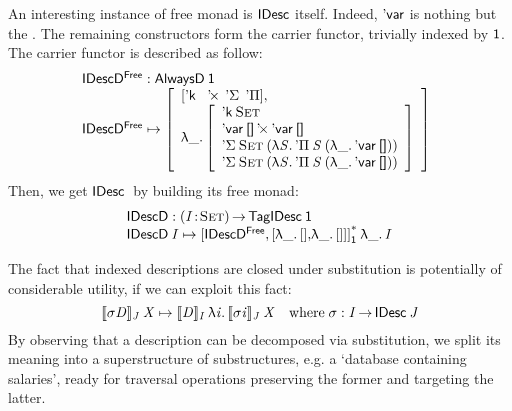 An interesting instance of free monad is $\SYMBIDesc$ itself. Indeed,
$\SYMBDVar$ is nothing but the \return. The remaining constructors form
the carrier functor, trivially indexed by $\Unit$. The carrier functor
is described as follow:
%
\[\stk{
\IDescFreeD : \ATagIDesc{\Unit} \\
\begin{array}{@{}ll}
\IDescFreeD \mapsto \bigRedBracket{\begin{array}{l}
                                \sqr{\SYMBDConst\:\:
                                     \DProd\:\:
                                     \SYMBDSigma\:\:
                                     \SYMBDPi} \red{,}\\
                                  \LAM{\_}\bigRedBracket{\begin{array}{l}
                                        \DConst{\Set}               \\
                                        \DProd{\DVar{\Void}}{\DVar{\Void}}  \\
                                        \DSigma{\Set}{(\LAM{\V{S}} \DPi{\V{S}}{(\LAM{\_} \DVar{\Void})})} \\
                                        \DSigma{\Set}{(\LAM{\V{S}} \DPi{\V{S}}{(\LAM{\_} \DVar{\Void})})}
                                    \end{array}}\end{array}}
\end{array}
}\]
%
Then, we get $\IDesc$ by building its free monad:
%
\[\stk{
\IDescD : \PI{\V{I}}{\Set} \TagIDesc{\Unit} \\
\IDescD\: \V{I} \mapsto \FreeIMonad{\red{[}\IDescFreeD\red{,[}\LAM{\_}\sqr{}\red{,}\LAM{\_}\red{[]]]}}{\Unit}\LAM{\_}\V{I}
}\]

The fact that indexed descriptions are closed under substitution
is potentially of considerable utility, if we can exploit this fact:
\[
\idescop{\V{\sigma} \V{D}}{\V{J}}{\V{X}} 
    \mapsto 
        \idescop{\V{D}}
                {\V{I}}
                {\LAM{\V{i}}
                     {\idescop{\V{\sigma} \V{i}}
                              {\V{J}}
                              {\V{X}}}}
        \quad \mbox{where}\;\V{\sigma}:\V{I}\To\IDesc{\V{J}}
\]
By observing that a description can be decomposed via substitution, we
split its meaning into a superstructure of substructures, e.g. a
`database containing salaries', ready for traversal operations
preserving the former and targeting the latter.
 
\newpage
